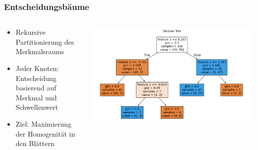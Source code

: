 \documentclass[aspectratio=1610, xcolor=dvipsnames, 9pt]{beamer}
\begin{document}
\begin{frame}
  \frametitle{Entscheidungsbäume}
  \begin{columns}
    \begin{column}{0.6\textwidth}
      \begin{itemize}
        \item Rekursive Partitionierung des Merkmalsraums
        \item Jeder Knoten: Entscheidung basierend auf Merkmal und Schwellenwert
        \item Ziel: Maximierung der Homogenität in den Blättern
      \end{itemize}
    \end{column}
    \begin{column}{0.4\textwidth}
      \includegraphics[width=\textwidth]{images/decision_trees.png}
    \end{column}
  \end{columns}
\end{frame}
\end{document}
